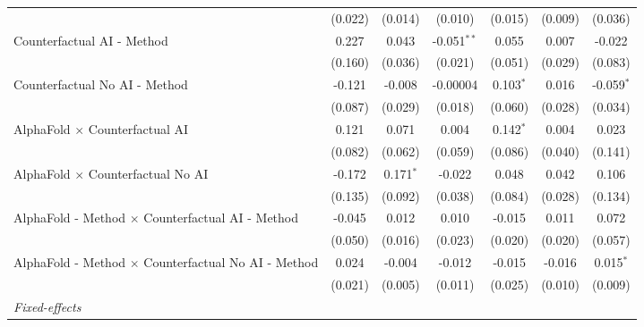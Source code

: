 \begin{tabular}{lcccccc}
                                                              & (0.022)   & (0.014)        & (0.010)       & (0.015)       & (0.009)       & (0.036)\\   
   Counterfactual AI - Method                                 & 0.227     & 0.043          & -0.051$^{**}$ & 0.055         & 0.007         & -0.022\\   
                                                              & (0.160)   & (0.036)        & (0.021)       & (0.051)       & (0.029)       & (0.083)\\   
   Counterfactual No AI - Method                              & -0.121    & -0.008         & -0.00004      & 0.103$^{*}$   & 0.016         & -0.059$^{*}$\\   
                                                              & (0.087)   & (0.029)        & (0.018)       & (0.060)       & (0.028)       & (0.034)\\   
   AlphaFold $\times$ Counterfactual AI                       & 0.121     & 0.071          & 0.004         & 0.142$^{*}$   & 0.004         & 0.023\\   
                                                              & (0.082)   & (0.062)        & (0.059)       & (0.086)       & (0.040)       & (0.141)\\   
   AlphaFold $\times$ Counterfactual No AI                    & -0.172    & 0.171$^{*}$    & -0.022        & 0.048         & 0.042         & 0.106\\   
                                                              & (0.135)   & (0.092)        & (0.038)       & (0.084)       & (0.028)       & (0.134)\\   
   AlphaFold - Method $\times$ Counterfactual AI - Method     & -0.045    & 0.012          & 0.010         & -0.015        & 0.011         & 0.072\\   
                                                              & (0.050)   & (0.016)        & (0.023)       & (0.020)       & (0.020)       & (0.057)\\   
   AlphaFold - Method $\times$ Counterfactual No AI - Method  & 0.024     & -0.004         & -0.012        & -0.015        & -0.016        & 0.015$^{*}$\\   
                                                              & (0.021)   & (0.005)        & (0.011)       & (0.025)       & (0.010)       & (0.009)\\   
   \midrule
   \emph{Fixed-effects}\\

\end{tabular}
